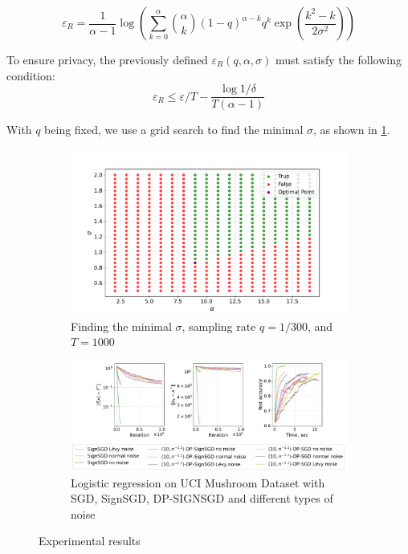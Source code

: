 \documentclass[a4paper, 12pt]{article}
\newcommand{\eps}{\varepsilon}
\begin{document}
\begin{equation}\label{eq:renyi_eps_guarantee}
\eps_R = \frac{1}{\alpha - 1} \log\left(\sum_{k=0}^{\alpha} {\alpha \choose k}  (1-q)^{\alpha-k}q^{k} \exp\left(\frac{k^2 - k}{2\sigma^2}\right)\right)
\end{equation}

To ensure privacy, the previously defined $\eps_R(q, \alpha, \sigma)$ must satisfy the following condition:
\begin{equation}\label{eq:renyi_eps_requirement}
\eps_R \leq \eps/T - \frac{\log 1/\delta}{T(\alpha - 1)}
\end{equation}

With $q$ being fixed, we use a grid search to find the minimal $\sigma$, as shown in \cref{fig:grid_sigma}.

\begin{figure}[h]
    \centering
    \begin{subfigure}[b]{0.39\textwidth}
        \centering
        \includegraphics[width=\textwidth]{grid_sigma_to_pres.pdf}
        \caption{Finding the minimal $\sigma$, sampling rate $q = 1/300$, and $T = 1000$}
        \label{fig:grid_sigma}
    \end{subfigure}
    \hfill
    \begin{subfigure}[b]{0.6\textwidth}
        \centering
        \includegraphics[width=\textwidth]{v28_constant_step/short/v28_constant_step_short.pdf}
        \caption{Logistic regression on UCI Mushroom Dataset with SGD, SignSGD, {\scriptsize DP-SIGN}SGD and different types of noise}
        \label{fig:logreg}
    \end{subfigure}
    \caption{Experimental results}
\end{figure}
\end{document}
